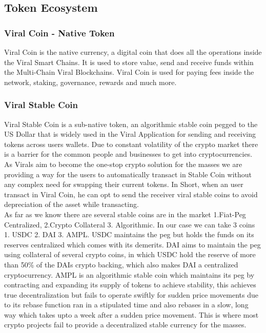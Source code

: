 \documentclass[10pt]{article}
\begin{document}
\subsection{Token Ecosystem}

\subsubsection{Viral Coin - Native Token}

Viral Coin is the native currency, a digital coin that does all the operations inside the Viral Smart Chains. It is used to store value, send and receive funds within the Multi-Chain Viral Blockchains. Viral Coin is used for paying fees inside the network, staking, governance, rewards and much more.\\

\subsubsection{Viral Stable Coin}

Viral Stable Coin is a sub-native token, an algorithmic stable coin pegged to the US Dollar that is widely used in the Viral Application for sending and receiving tokens across users wallets. Due to constant volatility of the crypto market there is a barrier for the common people and businesses to get into cryptocurrencies. As Viral\textsc{}s aim to become the one-stop crypto solution for the masses we are providing a way for the user\textsc{}s to automatically transact in Stable Coin without any complex need for swapping their current tokens. In Short, when an user transact in Viral Coin, he can opt to send the receiver viral stable coins to avoid depreciation of the asset while transacting.\\

As far as we know there are several stable coins are in the market 1.Fiat-Peg Centralized, 2.Crypto Collateral 3. Algorithmic. In our case we can take 3 coins 1. USDC 2. DAI 3. AMPL. USDC maintains the peg but holds the funds on its reserves centralized which comes with its demerits. DAI aims to maintain the peg using collateral of several crypto coins, in which USDC hold the reserve of more than 50\% of the DAI\textsc{}s crypto backing, which also makes DAI a centralized cryptocurrency. AMPL is an algorithmic stable coin which maintains it\textsc{}s peg by contracting and expanding it\textsc{}s supply of tokens to achieve stability, this achieves true decentralization but fails to operate swiftly for sudden price movements due to it\textsc{}s rebase function ran in a stipulated time and also rebases in a slow, long way which takes upto a week after a sudden price movement. This is where most crypto projects fail to provide a decentralized stable currency for the masses.\\
\end{document}
